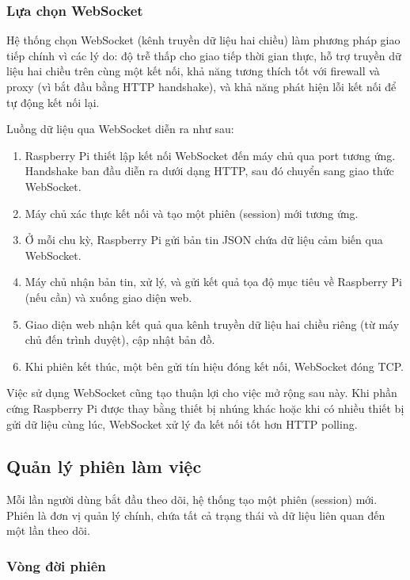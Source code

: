 \subsubsection{Lựa chọn WebSocket}

\hspace{0.5cm} Hệ thống chọn WebSocket (kênh truyền dữ liệu hai chiều) làm phương pháp giao tiếp chính vì các lý do: độ trễ thấp cho giao tiếp thời gian thực, hỗ trợ truyền dữ liệu hai chiều trên cùng một kết nối, khả năng tương thích tốt với firewall và proxy (vì bắt đầu bằng HTTP handshake), và khả năng phát hiện lỗi kết nối để tự động kết nối lại.

Luồng dữ liệu qua WebSocket diễn ra như sau:

\begin{enumerate}
    \item Raspberry Pi thiết lập kết nối WebSocket đến máy chủ qua port tương ứng. Handshake ban đầu diễn ra dưới dạng HTTP, sau đó chuyển sang giao thức WebSocket.
    \item Máy chủ xác thực kết nối và tạo một phiên (session) mới tương ứng.
    \item Ở mỗi chu kỳ, Raspberry Pi gửi bản tin JSON chứa dữ liệu cảm biến qua WebSocket.
    \item Máy chủ nhận bản tin, xử lý, và gửi kết quả tọa độ mục tiêu về Raspberry Pi (nếu cần) và xuống giao diện web.
    \item Giao diện web nhận kết quả qua kênh truyền dữ liệu hai chiều riêng (từ máy chủ đến trình duyệt), cập nhật bản đồ.
    \item Khi phiên kết thúc, một bên gửi tín hiệu đóng kết nối, WebSocket đóng TCP.
\end{enumerate}

Việc sử dụng WebSocket cũng tạo thuận lợi cho việc mở rộng sau này. Khi phần cứng Raspberry Pi được thay bằng thiết bị nhúng khác hoặc khi có nhiều thiết bị gửi dữ liệu cùng lúc, WebSocket xử lý đa kết nối tốt hơn HTTP polling.

\subsection{Quản lý phiên làm việc}

\hspace{0.5cm} Mỗi lần người dùng bắt đầu theo dõi, hệ thống tạo một phiên (session) mới. Phiên là đơn vị quản lý chính, chứa tất cả trạng thái và dữ liệu liên quan đến một lần theo dõi.

\subsubsection{Vòng đời phiên}

